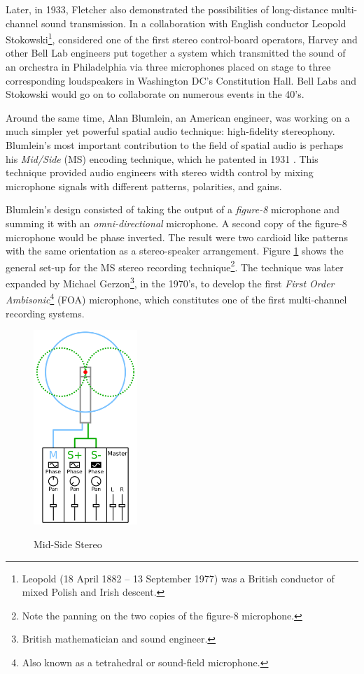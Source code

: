 Later, in 1933, Fletcher also demonstrated the possibilities of long-distance multi-channel sound transmission. In a collaboration with English conductor Leopold Stokowski\footnote{Leopold (18 April 1882 – 13 September 1977) was a British conductor of mixed Polish and Irish descent.}, considered one of the first stereo control-board operators\cite{mcginn1983stokowski}, Harvey and other Bell Lab engineers put together a system which transmitted the sound of an orchestra in Philadelphia via three microphones placed on stage to three corresponding loudspeakers in Washington DC's Constitution Hall. Bell Labs and Stokowski would go on to collaborate on numerous events in the 40's. 

Around the same time, Alan Blumlein, an American engineer, was working on a much simpler yet powerful spatial audio technique: high-fidelity stereophony. Blumlein's most important contribution to the field of spatial audio is perhaps his \textit{Mid/Side} (MS) encoding technique, which he patented in 1931 \cite{billingsley1987simulated}. This technique provided audio engineers with stereo width control by mixing microphone signals with different patterns, polarities, and gains. 

Blumlein's design consisted of taking the output of a \textit{figure-8} microphone and summing it with an \textit{omni-directional} microphone. A second copy of the figure-8 microphone would be phase inverted. The result were two cardioid like patterns with the same orientation as a stereo-speaker arrangement. Figure \ref{fig:ms_stereo} shows the general set-up for the MS stereo recording technique\footnote{Note the panning on the two copies of the figure-8 microphone.}. The technique was later expanded by Michael Gerzon\footnote{British mathematician and sound engineer.}, in the 1970's, to develop the first \textit{First Order Ambisonic}\footnote{Also known as a tetrahedral or sound-field microphone.} (FOA) microphone, which constitutes one of the first multi-channel recording systems.  

\begin{figure}[h!]%
\centering
\includegraphics[width=0.35\textwidth]{img/ms_stereo.svg.png}
\label{fig:ms_stereo}
\caption{Mid-Side Stereo \cite{FileMSst39online}}
\end{figure}

